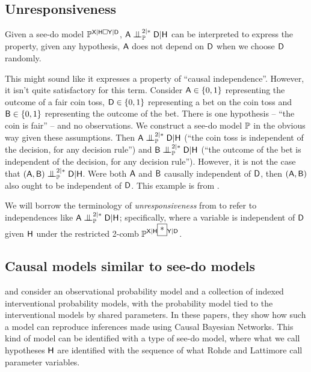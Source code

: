 \subsection{Unresponsiveness}

Given a see-do model $\mathbb{P}^{\mathsf{X}|\mathsf{H}\square \mathsf{Y}|\mathsf{D}}$, $\RV{A}\CI_{\prob{P}}^{2|*} \RV{D}|\RV{H}$ can be interpreted to express the property, given any hypothesis, $\mathsf{A}$ does not depend on $\mathsf{D}$ when we choose $\mathsf{D}$ randomly.

This might sound like it expresses a property of ``causal independence''. However, it isn't quite satisfactory for this term. Consider $\mathsf{A}\in\{0,1\}$ representing the outcome of a fair coin toss, $\mathsf{D}\in\{0,1\}$ representing a bet on the coin toss and $\mathsf{B}\in\{0,1\}$ representing the outcome of the bet. There is one hypothesis -- ``the coin is fair'' -- and no observations. We construct a see-do model $\mathbb{P}$ in the obvious way given these assumptions. Then $\RV{A}\CI_{\prob{P}}^{2|*} \RV{D}|\RV{H}$ (``the coin toss is independent of the decision, for any decision rule'') and $\RV{B}\CI_{\prob{P}}^{2|*}\RV{D}|\RV{H}$ (``the outcome of the bet is independent of the decision, for any decision rule''). However, it is not the case that $(\RV{A},\RV{B})\CI_{\prob{P}}^{2|*}\RV{D}|\RV{H}$. Were both $\mathsf{A}$ and $\mathsf{B}$ causally independent of $\mathsf{D}$, then $(\mathsf{A},\mathsf{B})$ also ought to be independent of $\mathsf{D}$. This example is from \citet{heckerman_decision-theoretic_1995}.

We will borrow the terminology of \emph{unresponsiveness} from \citet{heckerman_decision-theoretic_1995} to refer to independences like $\RV{A}\CI_{\prob{P}}^{2|*} \RV{D}|\RV{H}$; specifically, where a variable is independent of $\mathsf{D}$ given $\mathsf{H}$ under the restricted 2-comb $\model{P}^{\RV{X}|\RV{H}\framebox{*} \RV{Y}|\RV{D}}$.

\subsection{Causal models similar to see-do models}

\citet{lattimore_causal_2019} and \citet{lattimore_replacing_2019} consider an observational probability model and a collection of indexed interventional probability models, with the probability model tied to the interventional models by shared parameters. In these papers, they show how such a model can reproduce inferences made using Causal Bayesian Networks. This kind of model can be identified with a type of see-do model, where what we call hypotheses $\mathsf{H}$ are identified with the sequence of what Rohde and Lattimore call parameter variables.

